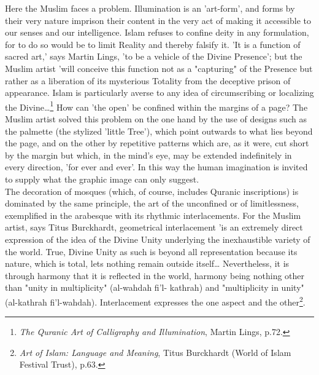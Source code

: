 \documentclass[11pt, b5paper, twoside]{book}
\begin{document}
Here the Muslim faces a problem. Illumination is an 'art-form', and forms by their very nature 
imprison their content in the very act of making it accessible to our senses and our intelligence. 
Islam refuses to confine deity in any formulation, for to do so would be to limit Reality and thereby 
falsify it. 'It is a function of sacred art,' says Martin Lings, 'to be a vehicle of the Divine 
Presence'; but the Muslim artist 'will conceive this function not as a "capturing" of the Presence 
but rather as a liberation of its mysterious Totality from the deceptive prison of appearance. Islam 
is particularly averse to any idea of circumscribing or localizing the Divine\ldots{}\footnote{\emph{The Quranic Art of Calligraphy and Illumination}, Martin Lings, p.72.} How can 'the 
open' be confined within the margins of a page? The Muslim artist solved this problem on the one hand 
by the use of designs such as the palmette (the stylized 'little Tree'), which point outwards to what 
lies beyond the page, and on the other by repetitive patterns which are, as it were, cut short by the 
margin but which, in the mind's eye, may be extended indefinitely in every direction, 'for ever and 
ever'. In this way the human imagination is invited to supply what the graphic image can only 
suggest. \\

The decoration of mosques (which, of course, includes Quranic inscriptions) is dominated by the same 
principle, the art of the unconfined or of limitlessness, exemplified in the arabesque with its 
rhythmic interlacements. For the Muslim artist, says Titus Burckhardt, geometrical interlacement 'is 
an extremely direct expression of the idea of the Divine Unity underlying the inexhaustible variety 
of the world. True, Divine Unity as such is beyond all representation because its nature, which is 
total, lets nothing remain outside itself\ldots{} Nevertheless, it is through harmony that it is 
reflected in the world, harmony being nothing other than "unity in multiplicity" (al-wahdah fi'l-
kathrah) and "multiplicity in unity" (al-kathrah fi'l-wahdah). Interlacement expresses the one aspect 
and the other\footnote{\emph{Art of Islam: Language and Meaning}, Titus Burckhardt (World of Islam Festival Trust), p.63.}. \\
\end{document}
